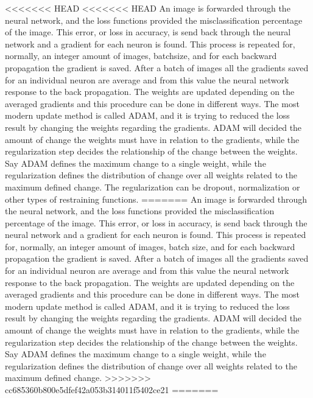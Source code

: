 <<<<<<< HEAD
<<<<<<< HEAD
An image is forwarded through the neural network, and the loss functions provided the misclassification percentage of the image. This error, or loss in accuracy, is send back through the neural network and a gradient for each neuron is found. This process is repeated for, normally, an integer amount of images, batchsize, and for each backward propagation the gradient is saved. After a batch of images all the gradients saved for an individual neuron are average and from this value the neural network response to the back propagation. The weights are updated depending on the averaged gradients and this procedure can be done in different ways. The most modern update method is called ADAM, and it is trying to reduced the loss result by changing the weights regarding the gradients. ADAM will decided the amount of change the weights must have in relation to the gradients, while the regularization step decides the relationship of the change between the weights. Say ADAM defines the maximum change to a single weight, while the regularization defines the distribution of change over all weights related to the maximum defined change. The regularization can be dropout, normalization or other types of restraining functions. 
=======
An image is forwarded through the neural network, and the loss functions provided the misclassification percentage of the image. This error, or loss in accuracy, is send back through the neural network and a gradient for each neuron is found. This process is repeated for, normally, an integer amount of images, batch size, and for each backward propagation the gradient is saved. After a batch of images all the gradients saved for an individual neuron are average and from this value the neural network response to the back propagation. The weights are updated depending on the averaged gradients and this procedure can be done in different ways. The most modern update method is called ADAM, and it is trying to reduced the loss result by changing the weights regarding the gradients. ADAM will decided the amount of change the weights must have in relation to the gradients, while the regularization step decides the relationship of the change between the weights. Say ADAM defines the maximum change to a single weight, while the regularization defines the distribution of change over all weights related to the maximum defined change.
>>>>>>> cc685360b800e5dfef42a053b314011f5402ce21
=======
